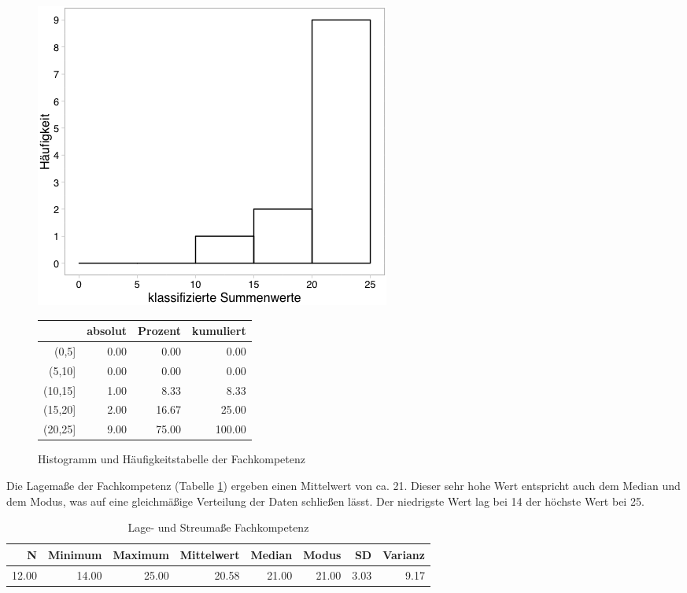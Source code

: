 \documentclass[12pt, bibliography=totoc]{scrartcl}
\begin{document}
\begin{figure}[H]

\begin{minipage}{.4\linewidth}
\includegraphics[width=0.8\linewidth]{Anhang/FKHistnn.png}

\end{minipage}
\begin{minipage}{.4\linewidth}
\centering
\raisebox{\depth}
{\begin{tabular}{rrrr}
  \hline
 & absolut & Prozent & kumuliert \\
  \hline
(0,5] & 0.00 & 0.00 & 0.00 \\
  (5,10] & 0.00 & 0.00 & 0.00 \\
  (10,15] & 1.00 & 8.33 & 8.33 \\
  (15,20] & 2.00 & 16.67 & 25.00 \\
  (20,25] & 9.00 & 75.00 & 100.00 \\
   \hline
\end{tabular}

}
\end{minipage}
\caption{Histogramm und Häufigkeitstabelle der Fachkompetenz}
\label{FK}
\end{figure}

Die Lagemaße der Fachkompetenz (Tabelle \ref{tab:lFK}) ergeben einen
Mittelwert von ca. 21. Dieser sehr hohe Wert entspricht auch dem Median
und dem Modus, was auf eine gleichmäßige Verteilung der Daten schließen
lässt. Der niedrigste Wert lag bei 14 der höchste Wert bei 25.

\begin{table}[H]
\centering
\caption{Lage- und Streumaße Fachkompetenz}
\label{tab:lFK}
\begin{tabular}{rrrrrrrr}
  \hline
  N & Minimum & Maximum & Mittelwert & Median & Modus & SD & Varianz \\
  \hline
 12.00 & 14.00 & 25.00 & 20.58 & 21.00 & 21.00 & 3.03 & 9.17 \\
   \hline
\end{tabular}
\end{table}
\end{document}
